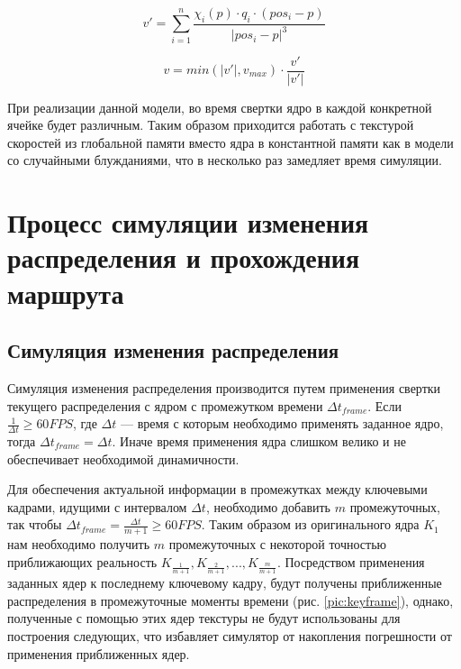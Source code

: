 \begin{itemize}
{\begin{equation}
  v' = \sum\limits_{i=1}^n\frac{\chi_i(p) \cdot q_i \cdot (pos_i-p)} {|pos_i-p|^3} 
\end{equation}

\begin{equation}\label{eq:vqulon}
  v = min(|v'|, v_{max}) \cdot \frac {v'} {|v'|}
\end{equation}

При реализации данной модели, во время свертки ядро в каждой конкретной ячейке будет различным.
Таким образом приходится работать с текстурой скоростей из глобальной памяти вместо ядра в константной
памяти как в модели со случайными блужданиями, что в несколько раз замедляет время симуляции.
}
\end{itemize}
\FloatBarrier

\section{Процесс симуляции изменения распределения
 и прохождения маршрута}
\FloatBarrier
\subsection{Симуляция изменения распределения}

Симуляция изменения распределения производится путем применения свертки текущего
распределения с ядром с промежутком времени $\Delta t_{frame}$. Если
$\frac {1} {\Delta t} \ge 60 FPS$, где $\Delta t$ --- время с которым необходимо применять
заданное ядро, тогда $\Delta t_{frame} = \Delta t$. Иначе время применения ядра слишком велико
и не обеспечивает необходимой динамичности.

Для обеспечения актуальной информации в промежутках между ключевыми кадрами, идущими с 
интервалом $\Delta t$, необходимо добавить $m$ промежуточных, так чтобы
$\Delta t_{frame} = \frac {\Delta t} {m + 1} \ge 60 FPS$. Таким образом из оригинального ядра
 $K_1$ нам необходимо получить $m$ промежуточных с некоторой точностью приближающих реальность 
$K_{\frac {1} {m+1}}, K_{\frac {2} {m + 1}}, ... , K_{\frac {m} {m + 1}}$. Посредством применения
заданных ядер к последнему ключевому кадру, будут получены приближенные распределения в 
промежуточные моменты времени (рис. \ref{pic:keyframe}), однако, полученные с помощью этих
 ядер текстуры не будут использованы для построения следующих, что избавляет симулятор 
от накопления погрешности от применения приближенных ядер.

